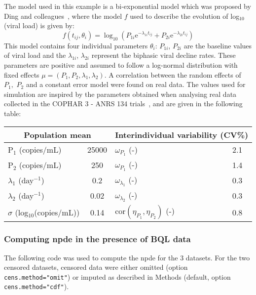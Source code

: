\hskip 18pt The model used in this example is a bi-exponential model which was proposed by Ding and colleagues~\cite{Ding1999}, where the model $f$ used to describe the evolution of log$_{10}$(viral load) is given by:
\begin{equation}
f(t_{ij},\theta_{i})=\log_{10}(P_{1i}\mbox{e}^{-\lambda_{1i}t_{ij}}+P_{2i}\mbox{e}^{-\lambda_{2i}t_{ij}})
\end{equation}
This model contains four individual parameters $\theta_{i}$: $P_{1i}$, $P_{2i}$ are the baseline values of viral load and the $\lambda_{1i}$, $\lambda_{2i}$ represent the biphasic viral decline rates. These parameters are positive and assumed to follow a log-normal distribution with fixed effects $\mu=(P_{1},P_{2},\lambda_{1},\lambda_{2})$. A correlation between the random effects of $P_{1},$ $P_{2}$ and a constant error model were found on real data. The values used for simulation are inspired by the parameters obtained when analysing real data collected in the COPHAR 3 - ANRS 134 trials~\cite{GoujardISA2010}, and are given in the following table:

\begin{center}
\begin{tabular} {l c | l c}
\hline 
\multicolumn{2}{c}{Population mean} & \multicolumn{2}{c}{Interindividual variability (CV\%)} \\
\hline 
P$_1$ (copies/mL) & 25000 & $\omega_{P_1}$ (-) & 2.1 \\
P$_2$ (copies/mL) & 250 & $\omega_{P_1}$ (-) & 1.4 \\
$\lambda_1$ (day$^{-1}$) & 0.2 & $\omega_{\lambda_1}$ (-) & 0.3 \\
$\lambda_2$ (day$^{-1}$) & 0.02 & $\omega_{\lambda_2}$ (-) & 0.3 \\
$\sigma $ (log$_{10}$(copies/mL)) & 0.14 & cor$(\eta_{P_1},\eta_{P_2})$ (-) & 0.8 \\
\hline
\end{tabular}
\end{center}

\subsubsection{Computing npde in the presence of BQL data}

\hskip 18pt The following code was used to compute the npde for the 3 datasets. For the two censored datasets, censored data were either omitted (option \texttt{cens.method="omit"}) or imputed as described in Methods (default, option \texttt{cens.method="cdf"}).

